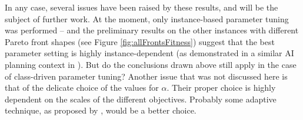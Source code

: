 \documentclass{llncs}
\begin{document}
In any case, several issues have been raised by these results, and will be the subject of further work. At the moment, only instance-based parameter tuning was performed -- and the preliminary results on the other instances with different Pareto front shapes (see Figure \ref{fig:allFrontsFitness}) suggest that the best parameter setting is highly instance-dependent (as demonstrated in a similar AI planning context in \cite{Bibai:2010:GPT:1830483.1830528}). But do the conclusions drawn above still apply in the case of class-driven parameter tuning?
Another issue that was not discussed here is that of the delicate choice of the values for $\alpha$. Their proper choice is highly dependent on the scales of the different objectives. Probably some adaptive technique, as proposed by \cite{adaptingWeightsEMO01}, would be a better choice. 

{\small


}
\end{document}
